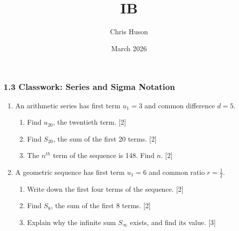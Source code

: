 \documentclass[12pt, twoside]{article}
\title{IB}
\author{Chris Huson}
\date{March 2026}
\begin{document}
\thispagestyle{firstpage}

\subsubsection*{1.3 Classwork: Series and Sigma Notation}
\begin{enumerate}[itemsep=0.5cm]
\item An arithmetic series has first term $u_1=3$ and common difference $d=5$.
    \begin{enumerate}[itemsep=0.25cm]
        \item Find $u_{20}$, the twentieth term. \hfill [2]
        \item Find $S_{20}$, the sum of the first 20 terms. \hfill [2]
        \item The $n^{th}$ term of the sequence is 148. Find $n$. \hfill [2]
    \end{enumerate}

\newpage
\item A geometric sequence has first term $u_1=6$ and common ratio $\displaystyle r=\frac{1}{2}$.
    \begin{enumerate}[itemsep=0.25cm]
        \item Write down the first four terms of the sequence. \hfill [2]
        \item Find $S_8$, the sum of the first 8 terms. \hfill [2]
        \item Explain why the infinite sum $S_\infty$ exists, and find its value. \hfill [3]
    \end{enumerate}


\end{enumerate}
\end{document}
